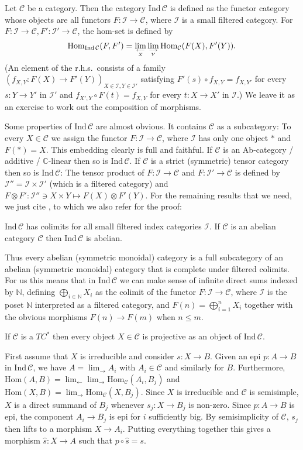\documentclass[11pt]{article}
\theoremstyle{definition}
\theoremstyle{definition}
\theoremstyle{remark}
\def\2#1{{\mathcal #1}}
\def\7#1{{\mathbb #1}}
\newcommand{\Hom}{\mathrm{Hom}}
\newcommand{\rarr}{\rightarrow}
\begin{document}
\bdefin Let $\2C$ be a category. Then the category
$\mathrm{Ind}\,\2C$ is defined as the functor category
whose objects are all functors $F:\2I\rarr\2C$, where
$\2I$ is a small filtered category.  For
$F:\2I\rarr\2C, F':\2I'\rarr\2C$, the hom-set is
defined by
\[ \Hom_{\mathrm{Ind}\,\2C}(F,F')=\lim_{\longleftarrow\atop X}\lim_{\longrightarrow\atop Y}
   \Hom_\2C(F(X),F'(Y)). \]
(An element of the r.h.s.\ consists of a family 
$(f_{X,Y}: F(X)\rarr F'(Y))_{X\in\2I, Y\in\2I'}$ satisfying $F'(s)\circ f_{X,Y}=f_{X,Y'}$ for every
$s:Y\rarr Y'$ in $\2I'$ and $f_{X',Y}\circ F(t)=f_{X,Y}$ for every $t:X\rarr X'$ in $\2I$.) We leave
it as an exercise to work out the composition of morphisms.
\edefin

Some properties of $\mathrm{Ind}\,\2C$ are almost obvious. It contains $\2C$ as a subcategory: To
every $X\in\2C$ we assign the functor $F:\2I\rarr\2C$, where $\2I$ has only one object $*$ and
$F(*)=X$. This embedding clearly is full and faithful. If $\2C$ is an 
Ab-category / additive / $\7C$-linear then so is $\mathrm{Ind}\,\2C$. If $\2C$ is a strict
(symmetric) tensor category then so is $\mathrm{Ind}\,\2C$: The tensor product of $F:\2I\rarr\2C$
and $F:\2I'\rarr\2C$ is defined by $\2I''=\2I\times\2I'$ (which is a filtered category) and 
$F\otimes F': \2I''\ni X\times Y\mapsto F(X)\otimes F'(Y)$. For the remaining results that we need,
we just cite \cite{SGA4}, to which we also refer for the proof:

\btheor 
$\mathrm{Ind}\,\2C$ has colimits for all small filtered index categories $\2I$.
If $\2C$ is an abelian category $\2C$ then $\mathrm{Ind}\,\2C$ is abelian.
\etheor

Thus every abelian (symmetric monoidal) category is a full subcategory of an abelian (symmetric monoidal)
category that is complete under filtered colimits. For us this means that in $\mathrm{Ind}\,\2C$ we
can make sense of infinite direct sums indexed by $\7N$, defining $\bigoplus_{i\in\7N} X_i$ as the
colimit of the functor $F:\2I\rarr\2C$, where $\2I$ is the poset $\7N$ interpreted as a filtered
category, and $F(n)=\bigoplus_{i=1}^n X_i$ together with the obvious morphisms $F(n)\rarr F(m)$ when
$n\le m$. 

\blemma \label{lem-proj}
If $\2C$ is a $TC^*$ then every object $X\in\2C$ is projective as an object of $\mathrm{Ind}\,\2C$.
\elemma

\prf First assume that $X$ is irreducible and consider $s:X\rarr B$. Given an epi $p:A\rarr B$ in
$\mathrm{Ind}\,\2C$, we have $A=\lim_{\longrightarrow}A_i$ with $A_i\in\2C$ and similarly for $B$.
Furthermore, $\Hom(A,B)=\lim_{\longleftarrow}\lim_{\longrightarrow}\Hom_\2C(A_i,B_j)$ and
$\Hom(X,B)=\lim_{\longrightarrow}\Hom_\2C(X,B_j)$. Since $X$ is irreducible and $\2C$ is semisimple,
$X$ is a direct summand of $B_j$ whenever $s_j:X\rarr B_j$ is non-zero. Since $p:A\rarr B$ is epi, the
component $A_i\rarr B_j$ is epi for $i$ sufficiently big. By semisimplicity of $\2C$, $s_j$ then
lifts to a morphism $X\rarr A_i$. Putting everything together this gives a morphism
$\widehat{s}:X\rarr A$ such that $p\circ\widehat{s}=s$.
\end{document}
